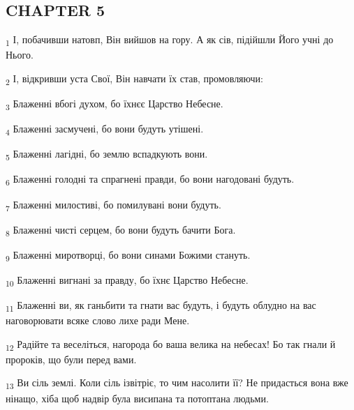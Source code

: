 \subsection{CHAPTER 5}
\begin{tcolorbox}
\textsubscript{1} І, побачивши натовп, Він вийшов на гору. А як сів, підійшли Його учні до Нього.
\end{tcolorbox}
\begin{tcolorbox}
\textsubscript{2} І, відкривши уста Свої, Він навчати їх став, промовляючи:
\end{tcolorbox}
\begin{tcolorbox}
\textsubscript{3} Блаженні вбогі духом, бо їхнєє Царство Небесне.
\end{tcolorbox}
\begin{tcolorbox}
\textsubscript{4} Блаженні засмучені, бо вони будуть утішені.
\end{tcolorbox}
\begin{tcolorbox}
\textsubscript{5} Блаженні лагідні, бо землю вспадкують вони.
\end{tcolorbox}
\begin{tcolorbox}
\textsubscript{6} Блаженні голодні та спрагнені правди, бо вони нагодовані будуть.
\end{tcolorbox}
\begin{tcolorbox}
\textsubscript{7} Блаженні милостиві, бо помилувані вони будуть.
\end{tcolorbox}
\begin{tcolorbox}
\textsubscript{8} Блаженні чисті серцем, бо вони будуть бачити Бога.
\end{tcolorbox}
\begin{tcolorbox}
\textsubscript{9} Блаженні миротворці, бо вони синами Божими стануть.
\end{tcolorbox}
\begin{tcolorbox}
\textsubscript{10} Блаженні вигнані за правду, бо їхнє Царство Небесне.
\end{tcolorbox}
\begin{tcolorbox}
\textsubscript{11} Блаженні ви, як ганьбити та гнати вас будуть, і будуть облудно на вас наговорювати всяке слово лихе ради Мене.
\end{tcolorbox}
\begin{tcolorbox}
\textsubscript{12} Радійте та веселіться, нагорода бо ваша велика на небесах! Бо так гнали й пророків, що були перед вами.
\end{tcolorbox}
\begin{tcolorbox}
\textsubscript{13} Ви сіль землі. Коли сіль ізвітріє, то чим насолити її? Не придасться вона вже нінащо, хіба щоб надвір була висипана та потоптана людьми.
\end{tcolorbox}
